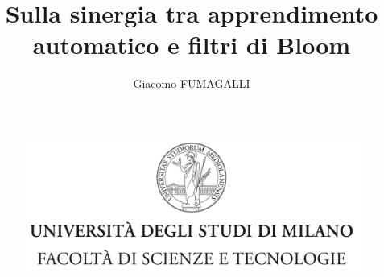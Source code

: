 \documentclass[a4paper,11pt]{report}
\begin{document}
\begin{figure}
    \centering
    \includegraphics[width=\textwidth]{immagini/Copertina/tesiSCIENZE_TECNOLOGIE.jpg}
\end{figure}
\title{Sulla sinergia tra apprendimento automatico e filtri di Bloom}
\author{Giacomo FUMAGALLI}
\beforepreface
\end{document}
